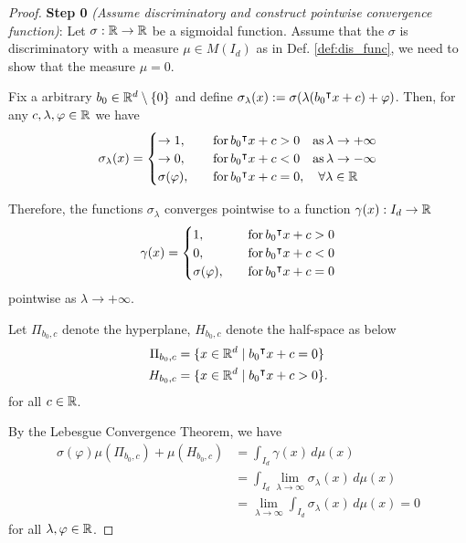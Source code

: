 \begin{proof}

    \textbf{Step 0} \textit{(Assume discriminatory and construct pointwise
    convergence function)}: Let $\sigma: \mathbb{R} \to \mathbb{R}$ be a sigmoidal function.
    Assume that the $\sigma$ is discriminatory with a measure $\mu \in M(I_d)$
    as in Def. \ref{def:dis_func}, we need to show that the measure $\mu = 0$.

    Fix a arbitrary $b_0 \in \mathbb{R}^d\setminus \{0\}$ and define
    $\sigma_{\lambda}(x) := \sigma(\lambda (b_0{}^{\intercal} x + c) + \varphi)$. Then, for
    any $c, \lambda, \varphi \in \mathbb{R}$ we have
    \begin{equation}
        \sigma_{\lambda}(x)
        = \begin{cases}
            \to 1, \quad &\operatorname{for} b_0{}^{\intercal} x + c > 0 \quad \text{as}\, \lambda \to +\infty \\
            \to 0, \quad &\operatorname{for} b_0{}^{\intercal} x + c < 0 \quad \text{as}\, \lambda \to -\infty \\
            \sigma(\varphi), \quad &\operatorname{for} b_0{}^{\intercal} x + c = 0, \quad\forall \lambda \in \mathbb{R}
        \end{cases}
    \end{equation}

    Therefore, the functions $\sigma_{\lambda}$ converges pointwise to a
    function $\gamma(x): I_d \to \mathbb{R}$
    \begin{equation}
        \gamma(x) = 
        \begin{cases}
            1,               \quad &\operatorname{for} b_0{}^{\intercal} x + c > 0 \\
            0,               \quad &\operatorname{for} b_0{}^{\intercal} x + c < 0 \\
            \sigma(\varphi), \quad &\operatorname{for} b_0{}^{\intercal} x + c = 0
        \end{cases}
    \end{equation}
    pointwise as $\lambda \to + \infty$.
    
    Let $\Pi_{b_0,c}$ denote the hyperplane, $H_{b_0, c}$ denote the
    half-space as below 
    \begin{align}
        \Pi_{b_0,c} &= \{x\in\mathbb{R}^d \mid b_0{}^{\intercal} x + c = 0\} \\
        H_{b_0, c}  &= \{x\in\mathbb{R}^d \mid b_0{}^{\intercal} x + c > 0\}.
    \end{align}
    for all $c \in \mathbb{R}$.
    
    By the Lebesgue Convergence Theorem, we have
    \begin{align*}
        \sigma(\varphi) \mu(\Pi_{b_0, c}) + \mu (H_{b_0, c})
        &= \int_{I_d} \gamma(x) \,d\mu(x) \\
        &= \int_{I_d} \lim_{\lambda\to\infty} \sigma_{\lambda}(x)\,d\mu(x) \\
        &= \lim_{\lambda\to\infty} \int_{I_d} \sigma_{\lambda}(x)\,d\mu(x) = 0
    \end{align*}
    for all $\lambda, \varphi \in \mathbb{R}$.


\end{proof}
